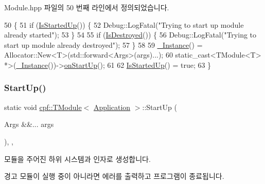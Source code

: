 Module.\+hpp 파일의 50 번째 라인에서 정의되었습니다.


\begin{DoxyCode}
50                                             \{
51             \textcolor{keywordflow}{if} (\hyperlink{classcpf_1_1_t_module_a73732afee7131dad652bf3e00c75cef9}{IsStartedUp}()) \{
52                 Debug::LogFatal(\textcolor{stringliteral}{"Trying to start up module already started"});
53             \}
54 
55             \textcolor{keywordflow}{if} (\hyperlink{classcpf_1_1_t_module_a9f70f0a70ac59b13b7a874f82c877337}{IsDestroyed}()) \{
56                 Debug::LogFatal(\textcolor{stringliteral}{"Trying to start up module already destroyed"});
57             \}
58 
59             \hyperlink{classcpf_1_1_t_module_a06ab8af8ea6b294959937fd2bbc1e615}{\_Instance}() = Allocator::New<T>(std::forward<Args>(args)...);
60             \textcolor{keyword}{static\_cast<}TModule<T> *\textcolor{keyword}{>}(\hyperlink{classcpf_1_1_t_module_a06ab8af8ea6b294959937fd2bbc1e615}{\_Instance}())->\hyperlink{classcpf_1_1_t_module_a4eb83b0848794e422d2d345439f51a04}{onStartUp}();
61 
62             \hyperlink{classcpf_1_1_t_module_a73732afee7131dad652bf3e00c75cef9}{IsStartedUp}() = \textcolor{keyword}{true};
63         \}
\end{DoxyCode}
\mbox{\label{classcpf_1_1_t_module_ac553266ad6255da045ef3f34b0f9bc16}} 
\subsubsection{\texorpdfstring{Start\+Up()}{StartUp()}\hspace{0.1cm}{\footnotesize\ttfamily [2/2]}}
{\footnotesize\ttfamily static void \hyperlink{classcpf_1_1_t_module}{cpf\+::\+T\+Module}$<$ \hyperlink{classcpf_1_1_application}{Application}  $>$\+::Start\+Up (\begin{DoxyParamCaption}\item[{Args \&\&...}]{args }\end{DoxyParamCaption})\hspace{0.3cm}{\ttfamily [inline]}, {\ttfamily [static]}, {\ttfamily [inherited]}}

모듈을 주어진 하위 시스템과 인자로 생성합니다. \begin{DoxyWarning}{경고}
모듈이 실행 중이 아니라면 에러를 출력하고 프로그램이 종료됩니다. 
\end{DoxyWarning}


